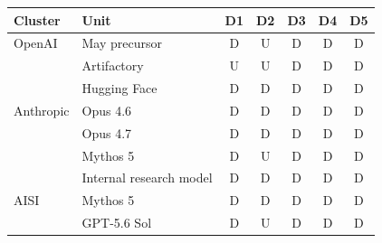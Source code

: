 \begin{tabular}{llccccc}
\toprule
Cluster & Unit & D1 & D2 & D3 & D4 & D5 \\
\midrule
OpenAI & May precursor & D & U & D & D & D \\
 & Artifactory & U & U & D & D & D \\
 & Hugging Face & D & D & D & D & D \\
\midrule
Anthropic & Opus 4.6 & D & D & D & D & D \\
 & Opus 4.7 & D & D & D & D & D \\
 & Mythos 5 & D & U & D & D & D \\
 & Internal research model & D & D & D & D & D \\
\midrule
AISI & Mythos 5 & D & D & D & D & D \\
 & GPT-5.6 Sol & D & U & D & D & D \\
\bottomrule
\end{tabular}
